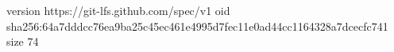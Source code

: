 version https://git-lfs.github.com/spec/v1
oid sha256:64a7dddcc76ea9ba25c45ec461e4995d7fec11e0ad44cc1164328a7dcecfc741
size 74
